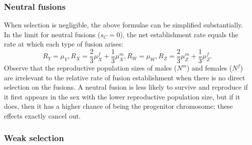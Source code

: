 \documentclass[12pt,twoside]{article}
\begin{document}
\subsubsection{Neutral fusions}
When selection is negligible, the above formulae can be simplified substantially. In the limit for neutral fusions ($s_C=\text{0}$), the net establishment rate equals the rate at which each type of fusion arises: 
\begin{subequations}
\begin{equation}
R_Y=\mu_Y,
\end{equation}
\begin{equation}
R_X=\frac{\text{2}}{\text{3}}\mu^f_X + \frac{\text{1}}{\text{3}}\mu^m_X,
\end{equation}
\begin{equation}
R_W=\mu_W,
\end{equation}
\begin{equation}
R_Z=\frac{\text{2}}{\text{3}}\mu^m_Z + \frac{\text{1}}{\text{3}}\mu^f_Z.
\end{equation}
\end{subequations}
Observe that the reproductive population sizes of males ($N^m$) and females ($N^f$) are irrelevant to the relative rate of fusion establishment when there is no direct selection on the fusions. A neutral fusion is less likely to survive and reproduce if it first appears in the sex with the lower reproductive population size, but if it does, then it has a higher chance of being the progenitor chromosome; these effects exactly cancel out.

\subsubsection{Weak selection}
\end{document}
